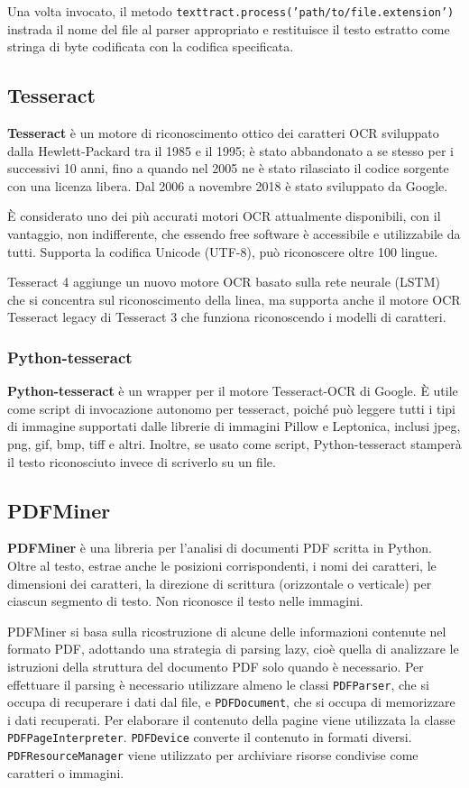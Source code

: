 Una volta invocato, il metodo \texttt{texttract.process('path/to/file.extension')} instrada il nome del file al parser appropriato e restituisce il testo estratto come stringa di byte codificata con la codifica specificata.\cite{textract}

\subsection{Tesseract}
\textbf{Tesseract} è un motore di riconoscimento ottico dei caratteri OCR sviluppato dalla Hewlett-Packard tra il 1985 e il 1995; è stato abbandonato a se stesso per i successivi 10 anni, fino a quando nel 2005 ne è stato rilasciato il codice
sorgente con una licenza libera. Dal 2006 a novembre 2018 è stato sviluppato da Google.

È considerato uno dei più accurati motori OCR attualmente disponibili, con il vantaggio, non indifferente, che essendo free software è accessibile e utilizzabile da tutti.
Supporta la codifica Unicode (UTF-8), può riconoscere oltre 100 lingue.

Tesseract 4 aggiunge un nuovo motore OCR basato sulla rete neurale (LSTM) che si concentra sul riconoscimento della linea, ma supporta anche il motore OCR Tesseract legacy di Tesseract 3 che funziona riconoscendo i modelli di caratteri.

\subsubsection{Python-tesseract}
\textbf{Python-tesseract} è un wrapper per il motore Tesseract-OCR di Google. È utile come script di invocazione autonomo per tesseract, poiché può leggere tutti i tipi di immagine supportati dalle librerie di immagini Pillow e Leptonica, inclusi jpeg, png, gif, bmp, tiff e altri. Inoltre, se usato come script, Python-tesseract stamperà il testo riconosciuto invece di scriverlo su un file.

\subsection{PDFMiner}
\textbf{PDFMiner} è una libreria per l’analisi di documenti PDF scritta in Python. Oltre al testo, estrae anche le posizioni corrispondenti, i nomi dei caratteri, le dimensioni dei caratteri, la direzione di scrittura (orizzontale o verticale) per ciascun segmento di testo. Non riconosce il testo nelle immagini.

PDFMiner si basa sulla ricostruzione di alcune delle informazioni contenute nel formato PDF, adottando una strategia di parsing lazy, cioè quella di analizzare le istruzioni della struttura del documento PDF solo quando è necessario.
Per effettuare il parsing è necessario utilizzare almeno le classi \texttt{PDFParser}, che si occupa di recuperare i dati dal file, e \texttt{PDFDocument}, che si occupa di memorizzare i dati recuperati.
Per elaborare il contenuto della pagine viene utilizzata la classe \texttt{PDFPageInterpreter}. \texttt{PDFDevice} converte il contenuto in formati diversi. \texttt{PDFResourceManager} viene utilizzato per archiviare risorse condivise come caratteri o immagini.